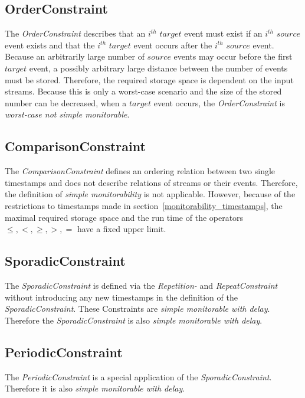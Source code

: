\subsection{OrderConstraint}
	The \emph{OrderConstraint} describes that an $i^{th}$ $target$ event must exist if an $i^{th}$ $source$ event exists and that the $i^{th}$ $target$ event occurs after the $i^{th}$ $source$ event.  Because an arbitrarily large number of $source$ events may occur before the first $target$ event, a possibly arbitrary large distance between the number of events must be stored. Therefore, the required storage space is dependent on the input streams.  Because this is only a worst-case scenario and the size of the stored number can be decreased, when a $target$ event occurs, the \emph{OrderConstraint} is \textit{worst-case not simple monitorable}.
	
\subsection{ComparisonConstraint}
	The \textit{ComparisonConstraint} defines an ordering relation between two single timestamps and does not describe relations of streams or their events. Therefore, the definition of \textit{simple monitorability} is not applicable. However, because of the restrictions to timestamps made in section~\ref{monitorability_timestamps}, the maximal required storage space and the run time of the operators $\leq, <, \geq, >, =$ have a fixed upper limit.
	
\subsection{SporadicConstraint}
	The \emph{SporadicConstraint} is defined via the \emph{Repetition-} and \emph{RepeatConstraint} without introducing any new timestamps in the definition of the \emph{SporadicConstraint}. These Constraints are \textit{simple monitorable with delay}. Therefore the \emph{SporadicConstraint} is also \textit{simple monitorable with delay}.
	
\subsection{PeriodicConstraint}
	The \emph{PeriodicConstraint} is a special application of the \emph{SporadicConstraint}. Therefore it is also \textit{simple monitorable with delay}.
	
